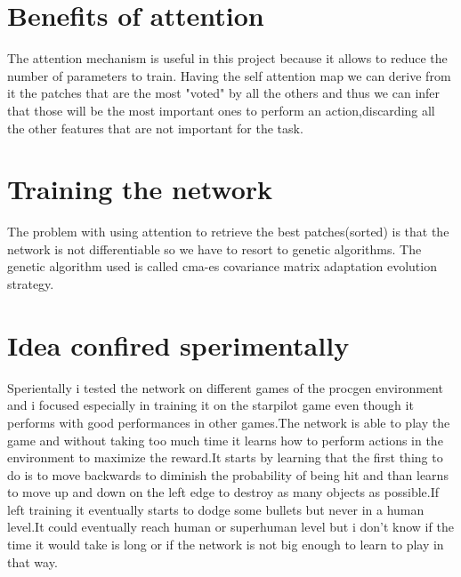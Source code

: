 \documentclass{article}
\begin{document}
\section{Benefits of attention}
The attention mechanism is useful in this project because it allows to reduce the number of parameters to train. Having the self attention map we can derive from it the patches that are the most "voted" by all the others and thus we can infer that those will be the most important ones to perform an action,discarding all the other features that are not important for the task.

\section{Training the network}
The problem with using attention to retrieve the best patches(sorted) is that the network is not differentiable so we have to resort to genetic algorithms.
The genetic algorithm used is called cma-es covariance matrix adaptation evolution strategy.

\section{Idea confired sperimentally}
Sperientally i tested the network on different games of the procgen environment and i focused especially in training it on the starpilot game even though it performs with good performances in other games.The network is able to play the game and without taking too much time it learns how to perform actions in the environment to maximize the reward.It starts by learning that the first thing to do is to move backwards to diminish the probability of being hit and than learns to move up and down on the left edge to destroy as many  objects as possible.If left training it eventually starts to dodge some bullets but never in a human level.It could eventually reach human or superhuman level but i don't know if the time it would take is long or if the network is not big enough to learn to play in that way. 
\end{document}
